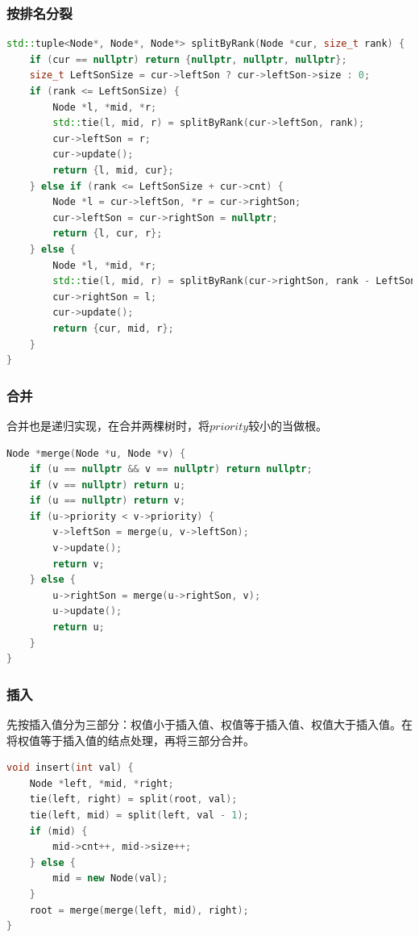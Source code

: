 \documentclass[utf8]{ctexbeamer}
\begin{document}
    \begin{frame}[fragile]
        \frametitle{按排名分裂}
        \begin{lstlisting}[language=c++]
std::tuple<Node*, Node*, Node*> splitByRank(Node *cur, size_t rank) {
    if (cur == nullptr) return {nullptr, nullptr, nullptr};
    size_t LeftSonSize = cur->leftSon ? cur->leftSon->size : 0;
    if (rank <= LeftSonSize) {
        Node *l, *mid, *r;
        std::tie(l, mid, r) = splitByRank(cur->leftSon, rank);
        cur->leftSon = r;
        cur->update();
        return {l, mid, cur};
    } else if (rank <= LeftSonSize + cur->cnt) {
        Node *l = cur->leftSon, *r = cur->rightSon;
        cur->leftSon = cur->rightSon = nullptr;
        return {l, cur, r};
    } else {
        Node *l, *mid, *r;
        std::tie(l, mid, r) = splitByRank(cur->rightSon, rank - LeftSonSize - cur->cnt);
        cur->rightSon = l;
        cur->update();
        return {cur, mid, r};
    }
}
        \end{lstlisting}
    \end{frame}
    
    \begin{frame}[fragile]
        \frametitle{合并}
        合并也是递归实现，在合并两棵树时，将$priority$较小的当做根。
        \begin{lstlisting}[language=c++]
Node *merge(Node *u, Node *v) {
    if (u == nullptr && v == nullptr) return nullptr;
    if (v == nullptr) return u;
    if (u == nullptr) return v;
    if (u->priority < v->priority) {
        v->leftSon = merge(u, v->leftSon);
        v->update();
        return v;
    } else {
        u->rightSon = merge(u->rightSon, v);
        u->update();
        return u;
    }
}
        \end{lstlisting}
    \end{frame}

    \begin{frame}[fragile]
        \frametitle{插入}
        先按插入值分为三部分：权值小于插入值、权值等于插入值、权值大于插入值。在将权值等于插入值的结点处理，再将三部分合并。
        \begin{lstlisting}[language=c++]
void insert(int val) {
    Node *left, *mid, *right;
    tie(left, right) = split(root, val);
    tie(left, mid) = split(left, val - 1);
    if (mid) {
        mid->cnt++, mid->size++;
    } else {
        mid = new Node(val);
    }
    root = merge(merge(left, mid), right);
}
        \end{lstlisting}
    \end{frame}
    
\end{document}
